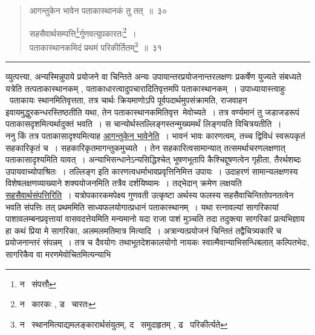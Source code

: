 \documentclass[11pt, openany]{book}
\begin{document}
\newpage

\begin{quote}
{\na आगन्तुकेन भावेन पताकास्थानकं तु तत्~॥~३०

सहसैवार्थसम्पत्ति\renewcommand{\thefootnote}{1}\footnote{न \textendash\ संपत्तौ}र्गुणवत्युपकारतः\renewcommand{\thefootnote}{2}\footnote{न \textendash\ कारकः , ड \textendash\ चारतः}~।\\
पताकास्थानकमिदं प्रथमं परिकीर्तितम्\renewcommand{\thefootnote}{3}\footnote{न \textendash\ स्थानमित्याद्यमलङ्कारार्थसंयुतम्, द \textendash\ समुदाहृतम् , ढ \textendash\ परिकीर्त्यते}~॥~३१}
\end{quote}

\hrule

\vspace{2mm}
\noindent
व्युत्पत्त्या, अन्यस्मिन्नुपाये प्रयोजने वा चिन्तिते अन्यः उपायान्तरप्रयोजनान्तरलक्षणः प्रकर्षेण युज्यते संबध्यते यत्रेति तत्पताकास्थानकम् , पताकाधारत्वादुपचारादितिवृत्तमपि पताकास्थानकम्~। उपाध्यायास्त्वाहुः \textendash\ पताकायः स्थानमितिवृत्तता, तत्र चार्थः क्रियमाणोऽपि पूर्वपदार्थमुपसंक्रामति, राजवाहन इवायमुद्धुरकन्धरस्तिष्ठतीति यथा, तेन पताकास्थानकमितिवृत्त\textendash\ मेवोच्यते~। तत्र वर्ण्यमानं तु जडाजडरूपं पताकासदृशमित्यर्थादुक्तं भवति~। स चान्योर्थस्तल्लिङ्गस्तन्मुख्यमर्थं लिङ्गयति विचित्रयतीति~।\\

ननु किं तत्र पताकासादृश्यमित्याह \underline{आगन्तुकेन भावेनेति}~। भावनं भावः कारणत्वम्, तच्च द्विविधं स्वरूपकृतं सहकारिकृतं च~। सहकारिकृतमागन्तुकमुच्यते~। तेन सहकारित्वसामान्यात् तत्समर्थाचरणलक्षणात् पताकासादृश्यमिति यावत्~। अन्याभिसन्धानेऽन्यसिद्धिश्चेत् भूषणभूतापि कैश्चिद्दूषणत्वेन गृहीता, तैरर्थशब्दः उपायवाच्योपाश्रितः~। तल्लिङ्ग इति कारणत्वधर्माभावप्रवृत्तिनिमित्त उपायः~। उदाहरणं सामान्यलक्षणस्य विशेषलक्षणव्याख्याने शक्ययोजनमिति तत्रैव दर्शयिष्यामः~। तद्भेदान् क्रमेण लक्षयति \underline{सहसैवार्थसंपत्तिरिति}~। यत्रोपकारकमपेक्ष्य गुणवती उत्कृष्टा अर्थस्य फलस्य सहसैवाचिन्तितोपनतत्वेन भवति संपत्तिः तत् प्रथममिति साध्यफलयोगात्प्रधानं पताकास्थानम्~। यथा रत्नावल्यां सागरिकायां पाशावलम्बनप्रवृत्तायां वासवदत्तेयमिति मन्यमानो यदा राजा पाशं मुञ्चति तदा तदुक्त्या सागरिकां प्रत्यभिज्ञाय {\qt हा कथं प्रिया मे सागरिका, अलमलमतिमात्र} मित्यादि~। अत्रान्यत्प्रयोजनं चिन्तितं तद्वैचित्र्यकारि च प्रयोजनान्तरं संपन्नम्~। तत्र च दैवयोगः तथाभूतदेशकालयोगो नायकः स्वात्मैवान्याभिसन्धिबलात् कल्पितभेदः, सागरिकैव वा मरणमेवोचितमित्यन्याभि \textendash

\newpage
\end{document}
